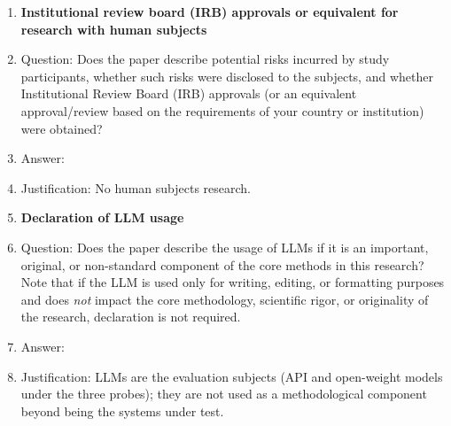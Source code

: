 \begin{enumerate}
\item {\bf Institutional review board (IRB) approvals or equivalent for research with human subjects}
    \item[] Question: Does the paper describe potential risks incurred by study participants, whether such risks were disclosed to the subjects, and whether Institutional Review Board (IRB) approvals (or an equivalent approval/review based on the requirements of your country or institution) were obtained?
    \item[] Answer: \answerNA{}
    \item[] Justification: No human subjects research.

\item {\bf Declaration of LLM usage}
    \item[] Question: Does the paper describe the usage of LLMs if it is an important, original, or non-standard component of the core methods in this research? Note that if the LLM is used only for writing, editing, or formatting purposes and does \emph{not} impact the core methodology, scientific rigor, or originality of the research, declaration is not required.
    \item[] Answer: \answerYes{}
    \item[] Justification: LLMs are the evaluation subjects (API and open-weight models under the three probes); they are not used as a methodological component beyond being the systems under test.

\end{enumerate}
